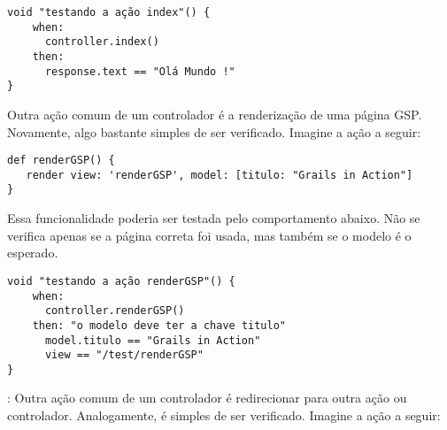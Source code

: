 \begin{mdframed}
\begin{footnotesize}
\begin{verbatim}
void "testando a ação index"() {
    when:
      controller.index()
    then:
      response.text == "Olá Mundo !"
}
\end{verbatim}
\end{footnotesize}
\end{mdframed}

\vspace{0.2cm}

 Outra  ação comum de  um controlador  é a
renderização  de  uma página  GSP.   Novamente,  algo  bastante simples  de  ser
verificado. Imagine a ação a seguir: 

\vspace{0.2cm}

\begin{mdframed}
\begin{footnotesize}
\begin{verbatim}
def renderGSP() {
   render view: 'renderGSP', model: [titulo: "Grails in Action"]
}
\end{verbatim}
\end{footnotesize}
\end{mdframed}

\vspace{0.1cm}

Essa  funcionalidade  poderia ser  testada  pelo  comportamento  abaixo. Não  se
verifica  apenas se  a página  correta foi  usada, mas  também se  o modelo  é o
esperado. 

\vspace{0.1cm}

\begin{mdframed}
\begin{footnotesize}
\begin{verbatim}
void "testando a ação renderGSP"() {
    when:
      controller.renderGSP()
    then: "o modelo deve ter a chave titulo"
      model.titulo == "Grails in Action"
      view == "/test/renderGSP"
}
\end{verbatim}
\end{footnotesize}
\end{mdframed}

\newpage

: Outra  ação comum de um controlador é
redirecionar  para outra  ação ou  controlador. Analogamente,  é simples  de ser
verificado.  Imagine a ação a seguir:

